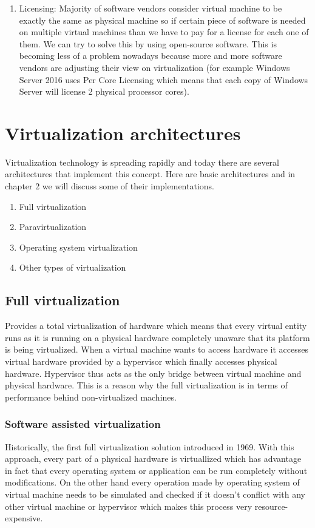 \begin{enumerate}
\item Licensing: Majority of software vendors consider virtual machine to be exactly the same as physical machine so if certain piece of software is needed on multiple virtual machines than we have to pay for a license for each one of them. We can try to solve this by using open-source software. This is becoming less of a problem nowadays because more and more software vendors are adjusting their view on virtualization (for example Windows Server 2016 uses Per Core Licensing which means that each copy of Windows Server will license 2 physical processor cores).
\end{enumerate}

\section{Virtualization architectures}
Virtualization technology is spreading rapidly and today there are several architectures that implement this concept. Here are basic architectures and in chapter 2 we will discuss some of their implementations.
\begin{enumerate}
\item Full virtualization
\item Paravirtualization
\item Operating system virtualization
\item Other types of virtualization
\end{enumerate}

\subsection{Full virtualization}
Provides a total virtualization of hardware which means that every virtual entity runs as it is running on a physical hardware completely unaware that its platform is being virtualized. When a virtual machine wants to access hardware it accesses virtual hardware provided by a hypervisor which finally accesses physical hardware. Hypervisor thus acts as the only bridge between virtual machine and physical hardware. This is a reason why the full virtualization is in terms of performance behind non-virtualized machines.
\subsubsection{Software assisted virtualization}
Historically, the first full virtualization solution introduced in 1969. With this approach, every part of a physical hardware is virtuallized which has advantage in fact that every operating system or application can be run completely without modifications. On the other hand every operation made by operating system of virtual machine needs to be simulated and checked if it doesn't conflict with any other virtual machine or hypervisor which makes this process very resource-expensive.

